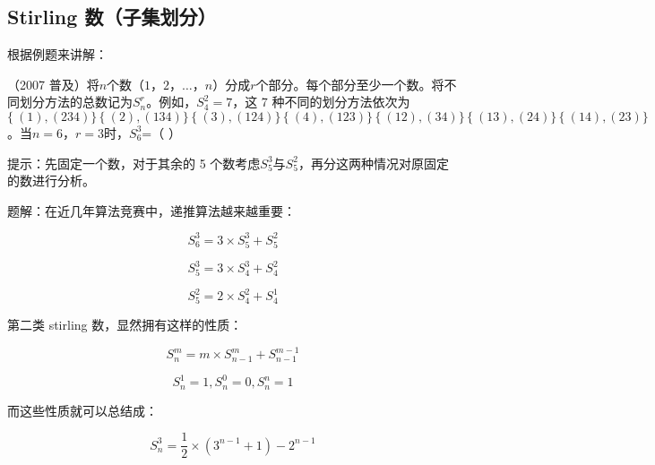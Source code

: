 
\subsection{Stirling 数（子集划分）}

根据例题来讲解：  

（2007 普及）将$n$个数$（1，2，…，n）$分成$r$个部分。每个部分至少一个数。将不同划分方法的总数记为$S_n^r$。例如，$S_4^2=7$，这 7 种不同的划分方法依次为 $\{\ (1) , (234) \}\,\{\ (2) ,  (134) \}\,\{\ (3) , (124) \}\,\{\ (4) , (123) \}\,\{\ (12) , (34) \}\,\{\ (13) , (24) \}\,\{\ (14) , (23) \}$。当$n=6，r=3$时，$S_6^3$=（    ）  

\begin{QUOTE}{}{}
提示：先固定一个数，对于其余的 5 个数考虑$S_5^3$与$S_5^2$，再分这两种情况对原固定的数进行分析。
\end{QUOTE}

题解：在近几年算法竞赛中，递推算法越来越重要：

$$
S_6^3=3 \times S_5^3 + S_5^2
$$

$$
S_5^3=3 \times S_4^3 + S_4^2
$$

$$
S_5^2=2 \times S_4^2 + S_4^1
$$

第二类 stirling 数，显然拥有这样的性质：

$$
S_n^m = m \times S_{n-1}^{m} + S_{n-1}^{m-1}
$$

$$
S_n^1 = 1,S_n^0 = 0,S_n^n = 1
$$

而这些性质就可以总结成：

$$
S_n^3 = \frac{1}{2} \times (3^{n-1}+1) - 2^{n-1}
$$
